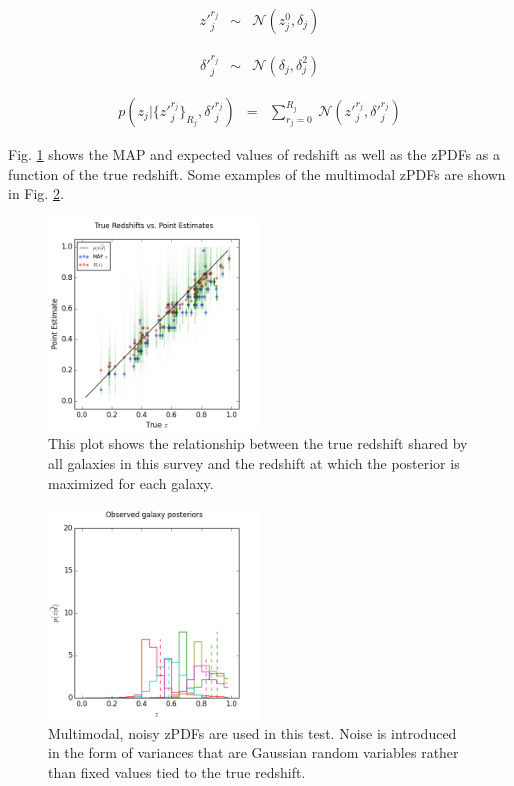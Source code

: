 \documentclass[preprint]{aastex}
\begin{document}
\begin{eqnarray}
\label{eq:zshift-milti}
z'^{r_{j}}_{j} &\sim& \mathcal{N}(z_{j}^{0},\delta_{j})
\end{eqnarray}

\begin{eqnarray}
\label{eq:znoise-multi}
\delta'^{r_{j}}_{j} &\sim& \mathcal{N}(\delta_{j},\delta^{2}_{j})
\end{eqnarray}

\begin{eqnarray}
\label{eq:zmany}
p(z_{j}|\{z'^{r_{j}}_{j}\}_{R_{j}},\delta'^{r_{j}}_{j}) &=& 
\sum_{r_{j}=0}^{R_{j}}\ \mathcal{N}(z'^{r_{j}}_{j},\delta'^{r_{j}}_{j})
\end{eqnarray}

Fig. \ref{fig:multicat} shows the MAP and expected values of redshift as well 
as the zPDFs as a function of the true redshift.  Some examples of the 
multimodal zPDFs are shown in Fig. \ref{fig:multipzs}.

\begin{figure}
\includegraphics[width=0.5\textwidth]{multi/truevmap.png}
\caption{This plot shows the relationship between the true redshift shared by 
all galaxies in this survey and the redshift at which the posterior is 
maximized for each galaxy.}
\label{fig:multicat}
\end{figure}

\begin{figure}
\includegraphics[width=0.5\textwidth]{multi/samplepzs.png}
\caption{Multimodal, noisy zPDFs are used in this test.  Noise is introduced in 
the form of variances that are Gaussian random variables rather than fixed 
values tied to the true redshift.}
\label{fig:multipzs}
\end{figure}
\end{document}
